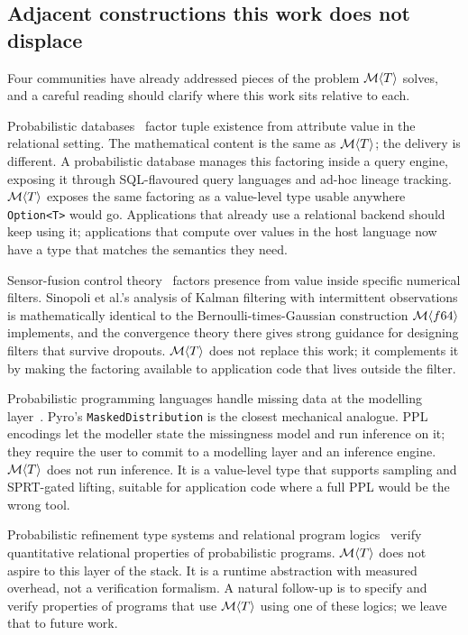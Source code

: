 \subsection{Adjacent constructions this work does not displace}
\label{sec:disc:notdisplace}

Four communities have already addressed pieces of the problem
$\mathcal{M}\langle T \rangle$ solves, and a careful reading should clarify
where this work sits relative to each.

Probabilistic databases~\cite{antova2007maybms,cheng2008orion} factor
tuple existence from attribute value in the relational setting. The
mathematical content is the same as $\mathcal{M}\langle T \rangle$; the
delivery is different. A probabilistic database manages this factoring
inside a query engine, exposing it through SQL-flavoured query languages
and ad-hoc lineage tracking. $\mathcal{M}\langle T \rangle$ exposes the same
factoring as a value-level type usable anywhere
\texttt{Option<T>} would go. Applications that already use a relational
backend should keep using it; applications that compute over values in
the host language now have a type that matches the semantics they need.

Sensor-fusion control theory~\cite{sinopoli2004kalman} factors presence
from value inside specific numerical filters. Sinopoli et al.'s analysis
of Kalman filtering with intermittent observations is mathematically
identical to the Bernoulli-times-Gaussian construction
$\mathcal{M}\langle f64 \rangle$ implements, and the convergence theory there
gives strong guidance for designing filters that survive dropouts.
$\mathcal{M}\langle T \rangle$ does not replace this work; it complements it
by making the factoring available to application code that lives
outside the filter.

Probabilistic programming languages handle missing data at the modelling
layer~\cite{carpenter2017stan,bingham2019pyro,ge2025turing}. Pyro's
\texttt{MaskedDistribution} is the closest mechanical analogue. PPL
encodings let the modeller state the missingness model and run inference
on it; they require the user to commit to a modelling layer and an
inference engine. $\mathcal{M}\langle T \rangle$ does not run inference. It is
a value-level type that supports sampling and SPRT-gated lifting,
suitable for application code where a full PPL would be the wrong tool.

Probabilistic refinement type systems and relational program
logics~\cite{vasilenko2022safecouplings,avanzini2025erhl} verify
quantitative relational properties of probabilistic programs.
$\mathcal{M}\langle T \rangle$ does not aspire to this layer of the stack. It
is a runtime abstraction with measured overhead, not a verification
formalism. A natural follow-up is to specify and verify properties of
programs that use $\mathcal{M}\langle T \rangle$ using one of these logics;
we leave that to future work.

\newpage